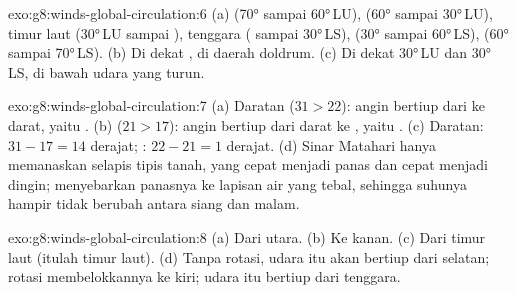 \begin{solution}{exo:g8:winds-global-circulation:6}
(a)  (\ang{70} sampai \ang{60}\,LU), 
(\ang{60} sampai \ang{30}\,LU),  timur laut (\ang{30}\,LU
sampai ),  tenggara ( sampai
\ang{30}\,LS),  (\ang{30} sampai \ang{60}\,LS),  (\ang{60} sampai \ang{70}\,LS). (b) Di dekat , di daerah
doldrum. (c) Di dekat \ang{30}\,LU dan \ang{30}\,LS, di bawah udara yang
turun.
\end{solution}

\begin{solution}{exo:g8:winds-global-circulation:7}
(a) Daratan ($31 > 22$): angin bertiup dari  ke darat, yaitu . (b)  ($21 > 17$): angin bertiup dari darat ke , yaitu . (c) Daratan: $31 - 17 = 14$ derajat; : $22 -
21 = 1$ derajat. (d) Sinar Matahari hanya memanaskan selapis tipis tanah,
yang cepat menjadi panas dan cepat menjadi dingin;  menyebarkan
panasnya ke lapisan air yang tebal, sehingga suhunya hampir tidak berubah
antara siang dan malam.
\end{solution}

\begin{solution}{exo:g8:winds-global-circulation:8}
(a) Dari utara. (b) Ke kanan. (c) Dari timur laut (itulah 
timur laut). (d) Tanpa rotasi, udara itu akan bertiup dari selatan; rotasi
membelokkannya ke kiri; udara itu bertiup dari tenggara.
\end{solution}

